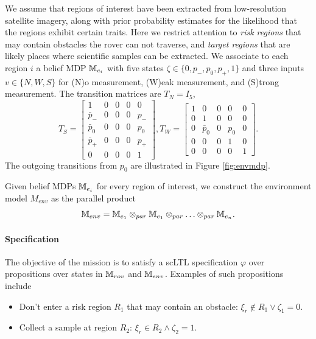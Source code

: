 \documentclass[conference]{IEEEtran}
\begin{document}
We assume that regions of interest have been extracted from low-resolution satellite imagery, along with prior probability estimates for the likelihood that the regions exhibit certain traits. Here we restrict attention to \emph{risk regions} that may contain obstacles the rover can not traverse, and \emph{target regions} that are likely places where scientific samples can be extracted. We associate to each region $i$ a belief MDP $\mathbb{M}_{e_i}$ with five states $\zeta \in \{ 0, p_-, p_0, p_+, 1\}$ and three inputs $v \in \{ N, W, S \}$ for (N)o measurement, (W)eak measurement, and (S)trong measurement. The transition matrices are $T_N = I_5$,
\begin{equation}
  T_{S} = \left[\begin{smallmatrix}
    1        &  0  &  0  &  0  &  0   \\
    \bar p_- &  0  &  0  &  0  &  p_- \\
    \bar p_0 &  0  &  0  &  0  &  p_0 \\
    \bar p_+ &  0  &  0  &  0  &  p_+ \\
    0        &  0  &  0  &  0  &  1
  \end{smallmatrix}\right],
  T_{W} = \left[\begin{smallmatrix}
    1        &  0                &  0  &  0           &  0   \\
    0        &  1                &  0  &  0           &  0 \\
    0        &  \bar p_0         &  0  & p_0          &  0\\
    0        &  0                &  0  &  1           &  0 \\
    0        &  0  &  0  &  0  &  1
  \end{smallmatrix}\right].
\end{equation}
The outgoing transitions from $p_0$ are illustrated in Figure \ref{fig:envmdp}.

Given belief MDPs $\mathbb{M}_{e_i}$ for every region of interest, we construct the environment model $M_{env}$ as the parallel product
\begin{equation}
  \mathbb{M}_{env} = \mathbb{M}_{e_1} \otimes_{par} \mathbb{M}_{e_1}  \otimes_{par} \ldots \otimes_{par} \mathbb{M}_{e_n}.
\end{equation}

\paragraph{Specification}

The objective of the mission is to satisfy a scLTL specification $\varphi$ over propositions over states in $\mathbb{M}_{rov}$ and $\mathbb{M}_{env}$. Examples of such propositions include
\begin{itemize}
  \item Don't enter a risk region $R_1$ that may contain an obstacle: $\xi_r \not  \in R_1 \lor \zeta_1 = 0$.
  \item Collect a sample at region $R_2$: $\xi_r \in R_2 \land \zeta_2 = 1$.
\end{itemize}
\end{document}
